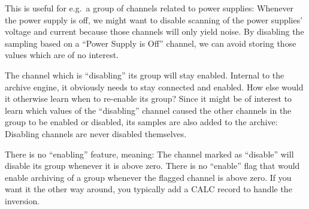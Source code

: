 This is useful for e.g.\ a group of channels related to power
supplies: Whenever the power supply is off, we might want to disable
scanning of the power supplies' voltage and current because those
channels will only yield noise. By disabling the sampling based on a
``Power Supply is Off'' channel, we can avoid storing those values
which are of no interest.

The channel which is ``disabling'' its group will stay enabled.
Internal to the archive engine, it obviously needs to stay connected
and enabled. How else would it otherwise learn when to re-enable
its group? Since it might be of interest to learn which values of the
``disabling'' channel caused the other channels in the group to be enabled
or disabled, its samples are also added to the archive: Disabling channels
are never disabled themselves.

\NOTE There is no ``enabling'' feature, meaning: The channel
marked as ``disable'' will disable its group whenever it is above
zero. There is no ``enable'' flag that would enable archiving of a group
whenever the flagged channel is above zero.
If you want it the other way around, you typically add a CALC record
to handle the inversion.

